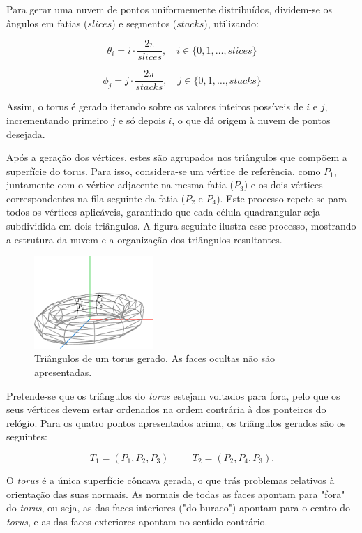 \documentclass[12pt, a4paper]{article}
\begin{document}
Para gerar uma nuvem de pontos uniformemente distribuídos, dividem-se os ângulos em fatias
($slices$) e segmentos ($stacks$), utilizando:

$$
\theta_i = i \cdot \frac{2\pi}{slices}, \quad i \in \{0, 1, \ldots, slices\}
$$

$$
\phi_j = j \cdot \frac{2\pi}{stacks}, \quad j \in \{0, 1, \ldots, stacks\}
$$

Assim, o torus é gerado iterando sobre os valores inteiros possíveis de $i$ e $j$, incrementando
primeiro $j$ e só depois $i$, o que dá origem à nuvem de pontos desejada.

Após a geração dos vértices, estes são agrupados nos triângulos que compõem a superfície do torus.
Para isso, considera-se um vértice de referência, como $P_1$, juntamente com o vértice adjacente
na mesma fatia ($P_3$) e os dois vértices correspondentes na fila seguinte da fatia ($P_2$ e
$P_4$).
Este processo repete-se para todos os vértices aplicáveis, garantindo que cada célula quadrangular
seja subdividida em dois triângulos. A figura seguinte ilustra esse processo, mostrando a estrutura
da nuvem e a organização dos triângulos resultantes.

\begin{figure}[H]
    \centering
    \includegraphics[width=0.4\textwidth]{res/figures/TorusTriangle.pdf}
    \caption{Triângulos de um torus gerado. As faces ocultas não são apresentadas.}
\end{figure}

Pretende-se que os triângulos do \emph{torus} estejam voltados para fora, pelo que os seus vértices
devem estar ordenados na ordem contrária à dos ponteiros do relógio. Para os quatro pontos
apresentados acima, os triângulos gerados são os seguintes:

$$
T_1 = (P_1, P_2, P_3)
\hspace{1cm}
T_2 = (P_2, P_4, P_3).
$$

O \emph{torus} é a única superfície côncava gerada, o que trás problemas relativos à orientação das
suas normais. As normais de todas as faces apontam para "fora"{} do \emph{torus}, ou seja, as das
faces interiores ("do buraco"{}) apontam para o centro do \emph{torus}, e as das faces exteriores
apontam no sentido contrário.
\end{document}
